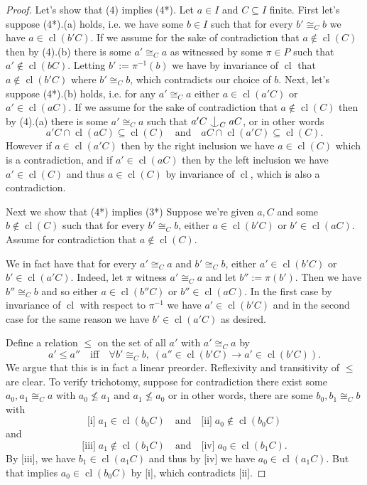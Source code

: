 \documentclass[12pt]{amsart}
\theoremstyle{plain}
\theoremstyle{definition}
\newcommand{\isom}{\cong}
\DeclareMathOperator{\cl}{cl}
\newcommand{\forkindep}[1][]{%
  \mathrel{
    \mathop{
      \vcenter{
        \hbox{\oalign{\noalign{\kern-.3ex}\hfil$\vert$\hfil\cr
              \noalign{\kern-.7ex}
              $\smile$\cr\noalign{\kern-.3ex}}}
      }
    }\displaylimits_{#1}
  }
}
\begin{document}
\begin{proof}
Let's show that (4) implies (4*).
Let $a \in I$ and $C \subseteq I$ finite.
First let's suppose (4*).(a) holds, i.e. we have some $b \in I$ such that for every $b' \isom_C b$ we have $a \in \cl(b'C)$.
If we assume for the sake of contradiction that $a \not\in \cl(C)$ then by (4).(b) there is some $a' \isom_C a$ as witnessed by some $\pi \in P$ such that $a' \not\in \cl(bC)$.
Letting $b' := \pi^{-1}(b)$ we have by invariance of $\cl$ that $a \not\in \cl(b'C)$ where $b' \isom_C b$, which contradicts our choice of $b$.
Next, let's suppose (4*).(b) holds, i.e. for any $a' \isom_C a$ either $a \in \cl(a'C)$ or $a' \in \cl(aC)$.
If we assume for the sake of contradiction that $a \not\in \cl(C)$ then by (4).(a) there is some $a' \isom_C a$ such that $a'C \forkindep[C] aC$, or in other words
\[ a'C \cap \cl(aC) \subseteq \cl(C) \quad \text{and} \quad aC \cap \cl(a'C) \subseteq \cl(C). \]
However if $a \in \cl(a'C)$ then by the right inclusion we have $a \in \cl(C)$ which is a contradiction, and if $a' \in \cl(aC)$ then by the left inclusion we have $a' \in \cl(C)$ and thus $a \in \cl(C)$ by invariance of $\cl$, which is also a contradiction.

Next we show that (4*) implies (3*)
Suppose we're given $a, C$ and some $b \not\in \cl(C)$ such that for every $b' \isom_C b$, either $a \in \cl(b'C)$ or $b' \in \cl(aC)$. 
Assume for contradiction that $a \not\in \cl(C)$. 

We in fact have that for every $a' \isom_C a$ and $b' \isom_C b$, either $a' \in \cl(b'C)$ or $b' \in \cl(a'C)$.
Indeed, let $\pi$ witness $a' \isom_C a$ and let $b'' := \pi(b')$.
Then we have $b'' \isom_C b$ and so either $a \in \cl(b''C)$ or $b'' \in \cl(aC)$.
In the first case by invariance of $\cl$ with respect to $\pi^{-1}$ we have $a' \in \cl(b'C)$ and in the second case for the same reason we have $b' \in \cl(a'C)$ as desired.

Define a relation $\le$ on the set of all $a'$ with $a' \isom_C a$ by
\[ a' \le a'' \quad \text{iff} \quad \forall b' \isom_C b, \; (a'' \in \cl(b'C) \rightarrow a' \in \cl(b'C)). \]
We argue that this is in fact a linear preorder.
Reflexivity and transitivity of $\le$ are clear. 
To verify trichotomy, suppose for contradiction there exist some $a_0, a_1 \isom_C a$ with $a_0 \not\le a_1$ and $a_1 \not\le a_0$ or in other words, there are some $b_0, b_1 \isom_C b$ with 
\[\text{[i]} \; a_1 \in \cl(b_0C) \quad \text{and} \quad \text{[ii]} \; a_0 \not\in \cl(b_0C)\]
and 
\[\text{[iii]} \; a_1 \not\in \cl(b_1C) \quad \text{and} \quad \text{[iv]} \; a_0 \in \cl(b_1C).\]
By [iii], we have $b_1 \in \cl(a_1C)$ and thus by [iv] we have $a_0 \in \cl(a_1C)$. 
But that implies $a_0 \in \cl(b_0C)$ by [i], which contradicts [ii].


\end{proof}
\end{document}

